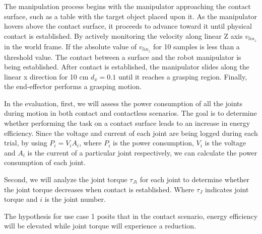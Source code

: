 \documentclass[report.tex]{subfiles}
\begin{document}
    The manipulation process begins with the manipulator approaching the contact surface, such as a table with the target object placed upon it. As the manipulator hovers above the contact surface, it proceeds to advance toward it until physical contact is established. By actively monitoring the velocity along linear Z axis $v_{lin_z}$in the world frame. If the absolute value of $v_{lin_z}$ for 10 samples is less than a threshold value. The contact between a surface and the robot manipulator is being established.
    After contact is established, the manipulator slides along the linear x direction for 10 cm $d_{x} = 0.1$ until it reaches a grasping region. Finally, the end-effector performs a grasping motion.
    
    In the evaluation, first, we will assess the power consumption of all the joints during motion in both contact and contactless scenarios. The goal is to determine whether performing the task on a contact surface leads to an increase in energy efficiency. Since the voltage and current of each joint are being logged during each trial, by using $P_i = V_i A_i$, where $P_i$ is the power consumption, $V_i$ is the voltage and $A_i$ is the current of a particular joint respectively, we can calculate the power consumption of each joint.

    Second, we will analyze the joint torque $\tau_{Ji}$ for each joint to determine whether the joint torque decreases when contact is established. Where $\tau_J$ indicates joint torque and $i$ is the joint number.

    The hypothesis for use case 1 posits that in the contact scenario, energy efficiency will be elevated while joint torque will experience a reduction.
\end{document}
